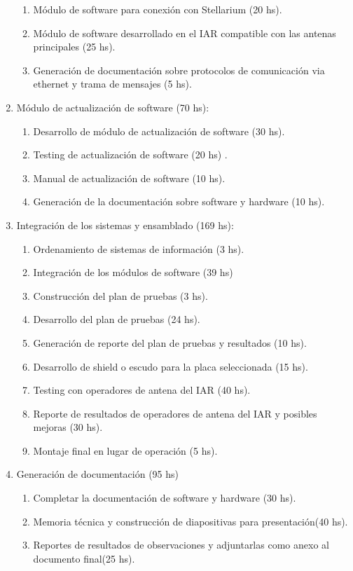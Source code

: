 \documentclass[11pt, %
codirector, %
]{charter}
\begin{document}
\begin{enumerate}
\begin{enumerate}
		\item Módulo de software para conexión con Stellarium (20 hs). 
		\item Módulo de software desarrollado en el IAR compatible con las antenas principales (25 hs). 
		\item Generación de documentación sobre protocolos de comunicación via ethernet y trama de mensajes (5 hs). 
	\end{enumerate}
\item Módulo de actualización de software (70 hs): 
	\begin{enumerate}
		\item Desarrollo de módulo de actualización de software (30 hs). 
		\item Testing de actualización de software (20 hs) . 
		\item Manual de actualización de software (10 hs).
		\item Generación de la documentación sobre software y hardware (10 hs).
		  
	\end{enumerate}	
\item Integración de los sistemas y ensamblado (169 hs): 
	\begin{enumerate}
	\item Ordenamiento de sistemas de información (3 hs). 
	\item Integración de los módulos de software (39 hs)
	\item Construcción del plan de pruebas (3 hs). 
	\item Desarrollo del plan de pruebas (24 hs). 
	\item Generación de reporte del plan de pruebas y resultados (10 hs).  
	\item Desarrollo de shield o escudo para la placa seleccionada (15 hs). 
	\item Testing con operadores de antena del IAR (40 hs). 
	\item Reporte de resultados de operadores de antena del IAR y posibles mejoras (30 hs).
	\item Montaje final en lugar de operación (5 hs).
	\end{enumerate}	
\item Generación de documentación (95 hs)
	
	\begin{enumerate}
	\item Completar la documentación de software y hardware (30 hs).
	\item Memoria técnica y construcción de diapositivas para presentación(40 hs). 
	\item Reportes de resultados de observaciones y adjuntarlas como anexo al documento final(25 hs). 
	\end{enumerate}
	

\end{enumerate}
	
\end{document}
